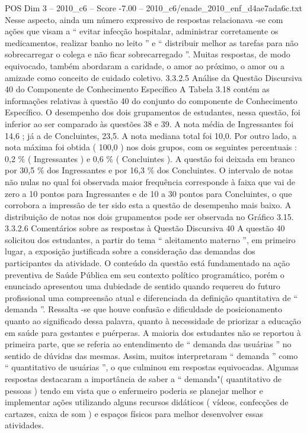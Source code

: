 \begin{textsample}{POS Dim 3 – 2010\_c6 – Score -7.00 – 2010\_c6/enade\_2010\_enf\_d4ae7ada6c.txt}
Nesse aspecto, ainda um número expressivo de respostas relacionava -se com ações que visam a “ evitar infecção hospitalar, administrar corretamente os medicamentos, realizar banho no leito ” e “ distribuir melhor as tarefas para não sobrecarregar o colega e não ficar sobrecarregado ”.
Muitas respostas, de modo equivocado, também abordaram a caridade, o amor ao próximo, o amor ou a amizade como conceito de cuidado coletivo. 3.3.2.5 Análise da Questão Discursiva 40 do Componente de Conhecimento Específico A Tabela 3.18 contém as informações relativas à questão 40 do conjunto do componente de Conhecimento Específico.
O desempenho dos dois grupamentos de estudantes, nessa questão, foi inferior ao ser comparado às questões 38 e 39.
A nota média de Ingressantes foi 14,6 ; já a de Concluintes, 23,5.
A nota mediana total foi 10,0.
Por outro lado, a nota máxima foi obtida ( 100,0 ) nos dois grupos, com os seguintes percentuais : 0,2 \% ( Ingressantes ) e 0,6 \% ( Concluintes ).
A questão foi deixada em branco por 30,5 \% dos Ingressantes e por 16,3 \% dos Concluintes.
O intervalo de notas não nulas no qual foi observada maior frequência corresponde à faixa que vai de zero a 10 pontos para Ingressantes e de 10 a 30 pontos para Concluintes, o que corrobora a impressão de ter sido esta a questão de desempenho mais baixo.
A distribuição de notas nos dois grupamentos pode ser observada no Gráfico 3.15. 3.3.2.6 Comentários sobre as respostas à Questão Discursiva 40 A questão 40 solicitou dos estudantes, a partir do tema “ aleitamento materno ”, em primeiro lugar, a exposição justificada sobre a consideração das demandas dos participantes da atividade.
O conteúdo da questão está fundamentado na ação preventiva de Saúde Pública em seu contexto político programático, porém o enunciado apresentou uma dubiedade de sentido quando requereu do futuro profissional uma compreensão atual e diferenciada da definição quantitativa de “ demanda ”.
Ressalta -se que houve confusão e dificuldade de posicionamento quanto ao significado dessa palavra, quanto à necessidade de priorizar a educação em saúde para gestantes e puérperas.
A maioria dos estudantes não se reportou à primeira parte, que se referia ao entendimento de “ demanda das usuárias ” no sentido de dúvidas das mesmas.
Assim, muitos interpretaram “ demanda ” como “ quantitativo de usuárias ”, o que culminou em respostas equivocadas.
Algumas respostas destacaram a importância de saber a “ demanda"( quantitativo de pessoas ) tendo em vista que o enfermeiro poderia se planejar melhor e implementar ações utilizando alguns recursos didáticos ( vídeos, confecções de cartazes, caixa de som ) e espaços físicos para melhor desenvolver essas atividades.

\end{textsample}
